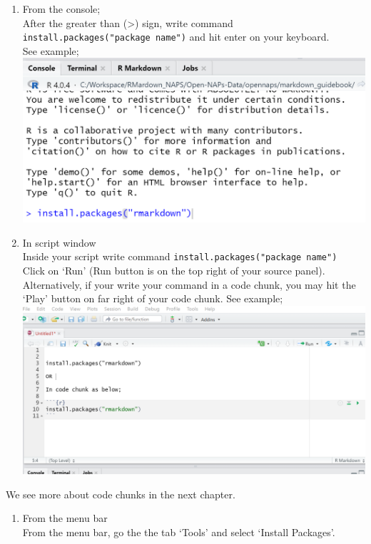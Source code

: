 \documentclass[
]{book}
\providecommand{\tightlist}{%
  \setlength{\itemsep}{0pt}\setlength{\parskip}{0pt}}
\begin{document}
\begin{enumerate}
\def\labelenumi{\arabic{enumi}.}
\tightlist
\item
  From the console;\\
  After the greater than (\textgreater) sign, write command \texttt{install.packages("package\ name")} and hit enter on your keyboard.\\
  See example;\\
  \includegraphics{tutorial_screenshots/install_rmkdn_consl.png}\\
\item
  In script window\\
  Inside your script write command \texttt{install.packages("package\ name")}\\
  Click on `Run' (Run button is on the top right of your source panel).\\
  Alternatively, if your write your command in a code chunk, you may hit the `Play' button on far right of your code chunk. See example;\\
  \includegraphics{tutorial_screenshots/install_rmkdn_scrpt.png}
\end{enumerate}

We see more about code chunks in the next chapter.

\begin{enumerate}
\def\labelenumi{\arabic{enumi}.}
\setcounter{enumi}{2}
\tightlist
\item
  From the menu bar\\
  From the menu bar, go the the tab `Tools' and select `Install Packages'.
\end{enumerate}
\end{document}
